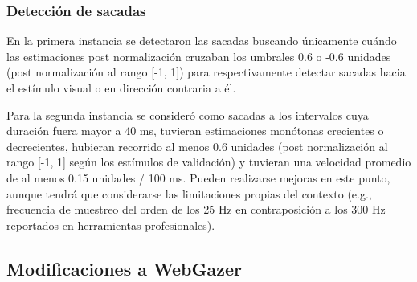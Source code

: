 \subsubsection{Detección de sacadas}

En la primera instancia se detectaron las sacadas buscando únicamente cuándo
las estimaciones post normalización cruzaban los umbrales 0.6 o -0.6 unidades
(post normalización al rango [-1, 1]) para respectivamente detectar sacadas
hacia el estímulo visual o en dirección contraria a él.

Para la segunda instancia se consideró como sacadas a los intervalos cuya
duración fuera mayor a 40 ms, tuvieran estimaciones monótonas crecientes o
decrecientes, hubieran recorrido al menos 0.6 unidades (post normalización al
rango [-1, 1] según los estímulos de validación) y tuvieran una velocidad
promedio de al menos 0.15 unidades / 100 ms.
Pueden realizarse mejoras en este punto, aunque tendrá que considerarse las
limitaciones propias del contexto (e.g., frecuencia de muestreo del orden de
los 25 Hz en contraposición a los 300 Hz reportados en herramientas
profesionales).


\subsection{Modificaciones a WebGazer}

